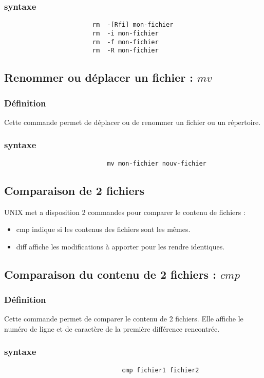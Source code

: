 				\subsubsection{syntaxe}					
					\begin{verbatim}
						rm  -[Rfi] mon-fichier
						rm  -i mon-fichier
						rm  -f mon-fichier
						rm  -R mon-fichier
					\end{verbatim}								
			\subsection{Renommer ou déplacer un fichier : $mv$}
					\subsubsection{Définition}			
						Cette commande permet de déplacer ou de renommer un fichier ou un répertoire.
					\subsubsection{syntaxe}					
						\begin{verbatim}
							mv mon-fichier nouv-fichier
						\end{verbatim}								
				
			\subsection{Comparaison de 2 fichiers}
				UNIX met a disposition 2 commandes pour comparer le contenu de fichiers :
				\begin{itemize}
					\item cmp indique si les contenus des fichiers sont les mêmes.
					\item diff affiche les modifications à apporter pour les rendre identiques.
				\end{itemize}
			
					\subsection{Comparaison du contenu de 2 fichiers : $cmp$}			
						\subsubsection{Définition}			
							Cette commande permet de comparer le contenu de 2 fichiers.
							Elle affiche le numéro de ligne et de caractère de la première différence rencontrée.
						\subsubsection{syntaxe}					
							\begin{verbatim}
						 		cmp fichier1 fichier2
							\end{verbatim}		
